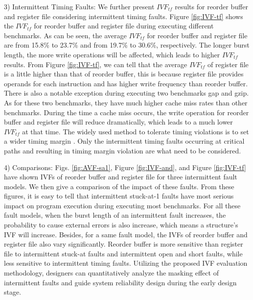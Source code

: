 3) Intermittent Timing Faults: We further present $IVF_{tf}$ results for reorder buffer and register file considering intermittent timing faults. Figure \ref{fig:IVF-tf} shows the $IVF_{tf}$ for reorder buffer and register file during executing different benchmarks. As can be seen, the average $IVF_{tf}$ for reorder buffer and register file are from 15.8\% to 23.7\% and from 19.7\% to 30.6\%, respectively. The longer burst length, the more write operations will be affected, which leads to higher $IVF_{tf}$ results. From Figure \ref{fig:IVF-tf}, we can tell that the average $IVF_{tf}$ of register file is a little higher than that of reorder buffer, this is because register file provides operands for each instruction and has higher write frequency than reorder buffer. There is also a notable exception during executing two benchmarks gap and gzip. As for these two benchmarks, they have much higher cache miss rates than other benchmarks. During the time a cache miss occurs, the write operation for reorder buffer and register file will reduce dramatically, which leads to a much lower $IVF_{tf}$ at that time. The widely used method to tolerate timing violations is to set a wider timing margin \cite{annavaram2007implications}. Only the intermittent timing faults occurring at critical paths and resulting in timing margin violation are what need to be considered.

4) Comparisons: Figs. \ref{fig:AVF-sa1}, Figure \ref{fig:IVF-and}, and Figure \ref{fig:IVF-tf} have shown IVFs of reorder buffer and register file for three intermittent fault models. We then give a comparison of the impact of these faults. From these figures, it is easy to tell that intermittent stuck-at-1 faults have most serious impact on program execution during executing most benchmarks. For all these fault models, when the burst length of an intermittent fault increases, the probability to cause external errors is also increase, which means a structure’s IVF will increase. Besides, for a same fault model, the IVFs of reorder buffer and register file also vary significantly. Reorder buffer is more sensitive than register file to intermittent stuck-at faults and intermittent open and short faults, while less sensitive to intermittent timing faults. Utilizing the proposed IVF evaluation methodology, designers can quantitatively analyze the masking effect of intermittent faults and guide system reliability design during the early design stage.

